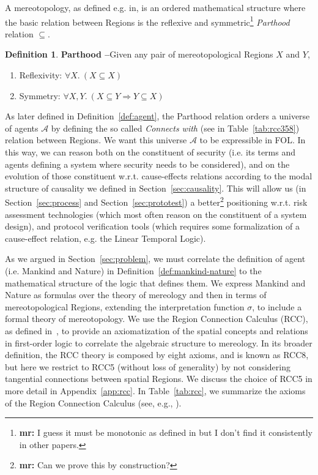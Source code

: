 \documentclass{article}
\newcommand{\fixnote}[2]{\textbf{\color{red}{FIX}}\footnote{{\bf #1:} #2}}
\theoremstyle{definition}
\newtheorem{definition}{Definition}[section]
\theoremstyle{corollary}
\theoremstyle{lemma}
\theoremstyle{theorem}
\theoremstyle{theorem}
\newcommand{\interpretation}{\sigma}
\newcommand{\agentuniverse}{\mathcal{A}}
\begin{document}
A mereotopology, as defined e.g. in\autocite{Rachavelpula2017mereotopology},
is an ordered mathematical structure where the basic relation between Regions is the
reflexive and symmetric\fixnote{mr}{I guess it must be monotonic as defined in\autocite{Rachavelpula2017mereotopology} but I don't find it consistently in other papers.} 
\emph{Parthood} relation $\subseteq$. 
\begin{definition}{\bf Parthood --}\label{def:parthood}
Given any pair of mereotopological Regions $X$ and $Y$,
	\begin{enumerate}[noitemsep]
		\item Reflexivity: $\forall X.~ (X\subseteq X)$
		\item Symmetry: $\forall X, Y.~ (X\subseteq Y \Rightarrow Y\subseteq X)$
	\end{enumerate}
\end{definition}

As later defined in Definition~\ref{def:agent}, 
the Parthood relation orders a universe of agents $\agentuniverse$ by defining
the so called \emph{Connects with} (see in Table~\ref{tab:rcc358}) relation 
between Regions. We want this universe $\agentuniverse$ to be 
expressible in FOL. In this way, we
can reason both on the constituent of security (i.e. its terms and agents
defining a system where security needs to be considered), and on 
the evolution of those constituent w.r.t. cause-effects relations according
to the modal structure of causality we defined in Section~\ref{sec:causality}.
This will allow us (in Section~\ref{sec:process} and Section~\ref{sec:prototest})
a better\fixnote{mr}{Can we prove this by construction?} 
positioning w.r.t. risk assessment technologies
(which most often reason on the constituent of a system design), and
protocol verification tools (which requires some formalization of a cause-effect relation, e.g.
the Linear Temporal Logic).

As we argued in Section~\ref{sec:problem}, we must correlate the definition of
agent (i.e. Mankind and Nature) in Definition~\ref{def:mankind-nature} to the
mathematical structure of the logic that defines them.  We express Mankind and
Nature as formulas over the theory of mereology and then in terms of
mereotopological Regions, extending the interpretation function
$\interpretation$, to include a formal theory of mereotopology.  We use the
Region Connection Calculus (RCC), as defined
in~\cite{bennettLogics,improvingRCC}, to provide an axiomatization of the
spatial concepts and relations in first-order logic to correlate the algebraic
structure to mereology. In its broader definition, the RCC theory is composed
by eight axioms, and is known as RCC8, but here we restrict to RCC5 (without
loss of generality) by not considering tangential connections between spatial
Regions. We discuss the choice of RCC5 in more detail in
Appendix~\ref{app:rcc}. In Table~\ref{tab:rcc}, we
summarize the axioms of the Region Connection Calculus (see, e.g., \autocite{Grutter2008rcc}).
\end{document}
